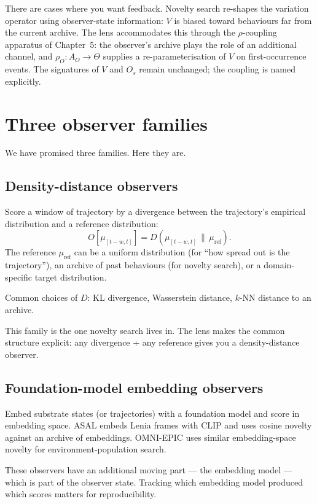 There are cases where you want feedback. Novelty search re-shapes the
variation operator using observer-state information: $V$ is biased
toward behaviours far from the current archive. The lens accommodates
this through the $\rho$-coupling apparatus of Chapter~5: the
observer's archive plays the role of an additional channel, and
$\rho_O : A_O \to \Theta$ supplies a re-parameterisation of $V$ on
first-occurrence events. The signatures of $V$ and $O_s$ remain
unchanged; the coupling is named explicitly.

\section{Three observer families}

We have promised three families. Here they are.

\subsection*{Density-distance observers}

Score a window of trajectory by a divergence between the trajectory's
empirical distribution and a reference distribution:
\[
  O[\mu_{[t-w,t]}] = D(\mu_{[t-w,t]} \,\|\, \mu_{\mathrm{ref}}).
\]
The reference $\mu_{\mathrm{ref}}$ can be a uniform distribution (for
``how spread out is the trajectory''), an archive of past behaviours
(for novelty search), or a domain-specific target distribution.

Common choices of $D$: KL divergence, Wasserstein distance, $k$-NN
distance to an archive.

This family is the one novelty search lives in. The lens makes the
common structure explicit: any divergence + any reference gives you a
density-distance observer.

\subsection*{Foundation-model embedding observers}

Embed substrate states (or trajectories) with a foundation model and
score in embedding space. ASAL embeds Lenia frames with CLIP and uses
cosine novelty against an archive of embeddings. OMNI-EPIC uses similar
embedding-space novelty for environment-population search.

These observers have an additional moving part --- the embedding
model --- which is part of the observer state. Tracking which
embedding model produced which scores matters for reproducibility.

